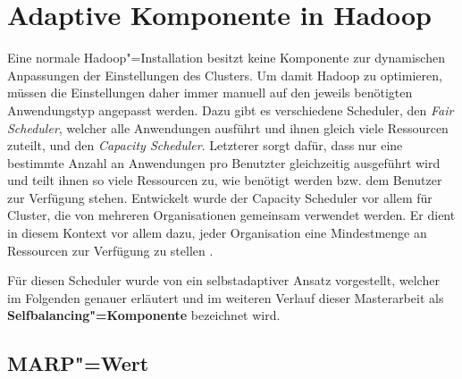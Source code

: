 \section{Adaptive Komponente in Hadoop}
\label{sec:inriaSetting}

Eine normale Hadoop"=Installation besitzt keine Komponente zur dynamischen Anpassungen der Einstellungen des Clusters.
Um damit Hadoop zu optimieren, müssen die Einstellungen daher immer manuell auf den jeweils benötigten Anwendungstyp angepasst werden.
Dazu gibt es \uA verschiedene Scheduler, den \emph{Fair Scheduler}, welcher alle Anwendungen ausführt und ihnen gleich viele Ressourcen zuteilt, und den \emph{Capacity Scheduler}.
Letzterer sorgt dafür, dass nur eine bestimmte Anzahl an Anwendungen pro Benutzter gleichzeitig ausgeführt wird und teilt ihnen so viele Ressourcen zu, wie benötigt werden bzw. dem Benutzer zur Verfügung stehen.
Entwickelt wurde der Capacity Scheduler vor allem für Cluster, die von mehreren Organisationen gemeinsam verwendet werden.
Er dient in diesem Kontext vor allem dazu, jeder Organisation eine Mindestmenge an Ressourcen zur Verfügung zu stellen \cite{HadoopCapScheduler271}.

Für diesen Scheduler wurde von \citeauthor{Zhang2016} \cite{Zhang2016} ein selbstadaptiver Ansatz vorgestellt, welcher im Folgenden genauer erläutert und im weiteren Verlauf dieser Masterarbeit als \textbf{Selfbalancing"=Komponente} bezeichnet wird.

\subsection{MARP"=Wert}
\label{subsec:selfbalancingMarp}

